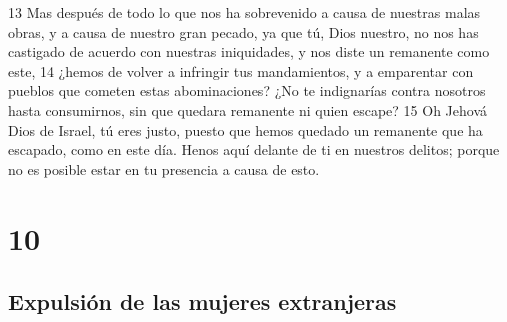 13 Mas después de todo lo que nos ha sobrevenido a causa de nuestras malas obras, y a causa de nuestro gran pecado, ya que tú, Dios nuestro, no nos has castigado de acuerdo con nuestras iniquidades, y nos diste un remanente como este,
14 ¿hemos de volver a infringir tus mandamientos, y a emparentar con pueblos que cometen estas abominaciones? ¿No te indignarías contra nosotros hasta consumirnos, sin que quedara remanente ni quien escape?
15 Oh Jehová Dios de Israel, tú eres justo, puesto que hemos quedado un remanente que ha escapado, como en este día. Henos aquí delante de ti en nuestros delitos; porque no es posible estar en tu presencia a causa de esto.

\chapter{10}

\section*{Expulsión de las mujeres extranjeras}


